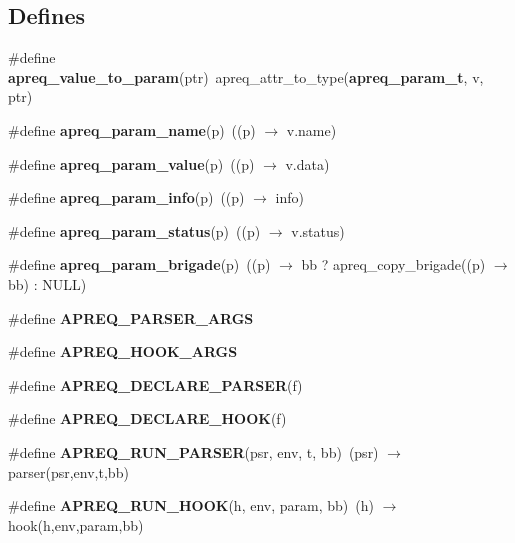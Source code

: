 \subsection*{Defines}
\begin{CompactItemize}
\item 
\#define {\bf apreq\_\-value\_\-to\_\-param}(ptr)\ apreq\_\-attr\_\-to\_\-type({\bf apreq\_\-param\_\-t}, v, ptr)
\item 
{}
\#define {\bf apreq\_\-param\_\-name}(p)\ ((p) $\rightarrow$ v.name)\label{apreq__params_8h_a23}

\item 
{}
\#define {\bf apreq\_\-param\_\-value}(p)\ ((p) $\rightarrow$ v.data)\label{apreq__params_8h_a24}

\item 
{}
\#define {\bf apreq\_\-param\_\-info}(p)\ ((p) $\rightarrow$ info)\label{apreq__params_8h_a25}

\item 
{}
\#define {\bf apreq\_\-param\_\-status}(p)\ ((p) $\rightarrow$ v.status)\label{apreq__params_8h_a26}

\item 
{}
\#define {\bf apreq\_\-param\_\-brigade}(p)\ ((p) $\rightarrow$ bb ? apreq\_\-copy\_\-brigade((p) $\rightarrow$ bb) : NULL)\label{apreq__params_8h_a27}

\item 
\#define {\bf APREQ\_\-PARSER\_\-ARGS}
\item 
\#define {\bf APREQ\_\-HOOK\_\-ARGS}
\item 
\#define {\bf APREQ\_\-DECLARE\_\-PARSER}(f)
\item 
\#define {\bf APREQ\_\-DECLARE\_\-HOOK}(f)
\item 
\#define {\bf APREQ\_\-RUN\_\-PARSER}(psr, env, t, bb)\ (psr) $\rightarrow$ parser(psr,env,t,bb)
\item 
\#define {\bf APREQ\_\-RUN\_\-HOOK}(h, env, param, bb)\ (h) $\rightarrow$ hook(h,env,param,bb)
\end{CompactItemize}
